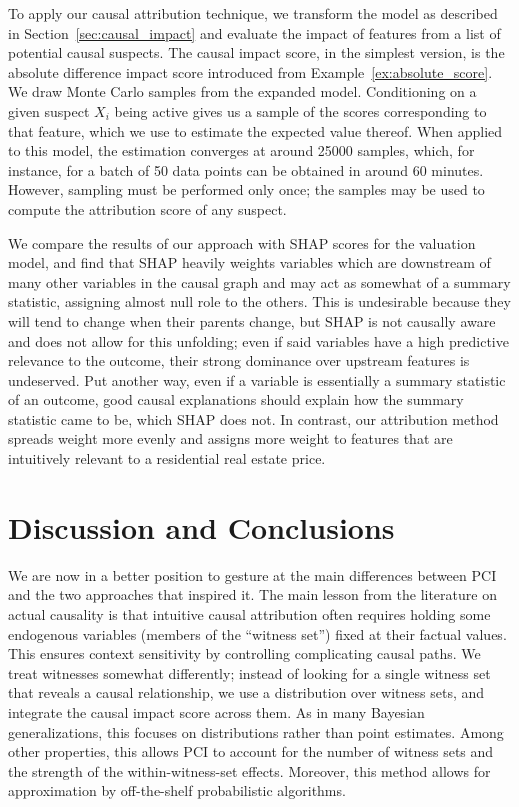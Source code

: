 \documentclass[anon,12pt]{clear2026} %
\newcommand{\ourapproach}{PCI }
\begin{document}
To apply our causal attribution technique, we transform the model as described in Section~\ref{sec:causal_impact} and evaluate the impact of features from a list of potential causal suspects.
The causal impact score, in the simplest version, is the absolute difference impact score introduced from Example~\ref{ex:absolute_score}.
We draw Monte Carlo samples from the expanded model.
Conditioning on a given suspect $X_i$ being active gives us a sample of the scores corresponding to that feature, which we use to estimate the expected value thereof.
When applied to this model, the estimation converges at around \num{25000} samples, which, for instance, for a batch of 50 data points can be obtained in around 60 minutes.
However, sampling must be performed only once; the samples may be used to compute the attribution score of any suspect.



We compare the results of our approach with SHAP scores \citep{lundberg2017unified} for the valuation model, and find that SHAP heavily weights variables which are downstream of many other variables in the causal graph and may act as somewhat of a summary statistic, assigning almost null role to the others.
This is undesirable because they will tend to change when their parents change, but SHAP is not causally aware and does not allow for this unfolding; even if said variables have a high predictive relevance to the outcome, their strong dominance over upstream features is undeserved. Put another way, even if a variable is essentially a summary statistic of an outcome, good causal explanations should explain how the summary statistic came to be, which SHAP does not.
In contrast, our attribution method spreads weight more evenly and assigns more weight to features that are intuitively relevant to a residential real estate price.

\section{Discussion and Conclusions}
\label{sec:discussion}

We are now in a better position to gesture at the main differences between \ourapproach and the two approaches that inspired it. The main lesson from the literature on actual causality is that intuitive causal attribution often requires holding some endogenous variables (members of the ``witness set'') fixed at their factual values. This ensures context sensitivity by controlling complicating causal paths. We treat witnesses somewhat differently; instead of looking for a single witness set that reveals a causal relationship, we use a distribution over witness sets, and integrate the causal impact score across them. As in many Bayesian generalizations, this focuses on distributions rather than point estimates. Among other properties, this allows \ourapproach to account for the number of witness sets and the strength of the within-witness-set effects. Moreover, this method allows for approximation by off-the-shelf probabilistic algorithms. 
\end{document}
